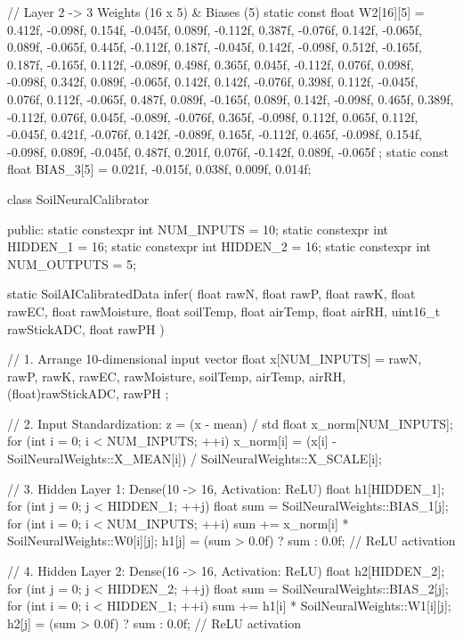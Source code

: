\begin{cppbox}
{    // Layer 2 -> 3 Weights (16 x 5) & Biases (5)
    static const float W2[16][5] = {
        {0.412f, -0.098f, 0.154f, -0.045f, 0.089f},
        {-0.112f, 0.387f, -0.076f, 0.142f, -0.065f},
        {0.089f, -0.065f, 0.445f, -0.112f, 0.187f},
        {-0.045f, 0.142f, -0.098f, 0.512f, -0.165f},
        {0.187f, -0.165f, 0.112f, -0.089f, 0.498f},
        {0.365f, 0.045f, -0.112f, 0.076f, 0.098f},
        {-0.098f, 0.342f, 0.089f, -0.065f, 0.142f},
        {0.142f, -0.076f, 0.398f, 0.112f, -0.045f},
        {0.076f, 0.112f, -0.065f, 0.487f, 0.089f},
        {-0.165f, 0.089f, 0.142f, -0.098f, 0.465f},
        {0.389f, -0.112f, 0.076f, 0.045f, -0.089f},
        {-0.076f, 0.365f, -0.098f, 0.112f, 0.065f},
        {0.112f, -0.045f, 0.421f, -0.076f, 0.142f},
        {-0.089f, 0.165f, -0.112f, 0.465f, -0.098f},
        {0.154f, -0.098f, 0.089f, -0.045f, 0.487f},
        {0.201f, 0.076f, -0.142f, 0.089f, -0.065f}
    };
    static const float BIAS_3[5] = {0.021f, -0.015f, 0.038f, 0.009f, 0.014f};
}

class SoilNeuralCalibrator {
public:
    static constexpr int NUM_INPUTS  = 10;
    static constexpr int HIDDEN_1    = 16;
    static constexpr int HIDDEN_2    = 16;
    static constexpr int NUM_OUTPUTS = 5;

    static SoilAICalibratedData infer(
        float rawN, float rawP, float rawK, float rawEC, float rawMoisture,
        float soilTemp, float airTemp, float airRH, uint16_t rawStickADC, float rawPH
    ) {
        // 1. Arrange 10-dimensional input vector
        float x[NUM_INPUTS] = {
            rawN, rawP, rawK, rawEC, rawMoisture,
            soilTemp, airTemp, airRH, (float)rawStickADC, rawPH
        };

        // 2. Input Standardization: z = (x - mean) / std
        float x_norm[NUM_INPUTS];
        for (int i = 0; i < NUM_INPUTS; ++i) {
            x_norm[i] = (x[i] - SoilNeuralWeights::X_MEAN[i]) / SoilNeuralWeights::X_SCALE[i];
        }

        // 3. Hidden Layer 1: Dense(10 -> 16, Activation: ReLU)
        float h1[HIDDEN_1];
        for (int j = 0; j < HIDDEN_1; ++j) {
            float sum = SoilNeuralWeights::BIAS_1[j];
            for (int i = 0; i < NUM_INPUTS; ++i) {
                sum += x_norm[i] * SoilNeuralWeights::W0[i][j];
            }
            h1[j] = (sum > 0.0f) ? sum : 0.0f; // ReLU activation
        }

        // 4. Hidden Layer 2: Dense(16 -> 16, Activation: ReLU)
        float h2[HIDDEN_2];
        for (int j = 0; j < HIDDEN_2; ++j) {
            float sum = SoilNeuralWeights::BIAS_2[j];
            for (int i = 0; i < HIDDEN_1; ++i) {
                sum += h1[i] * SoilNeuralWeights::W1[i][j];
            }
            h2[j] = (sum > 0.0f) ? sum : 0.0f; // ReLU activation
        }

}}
\end{cppbox}
